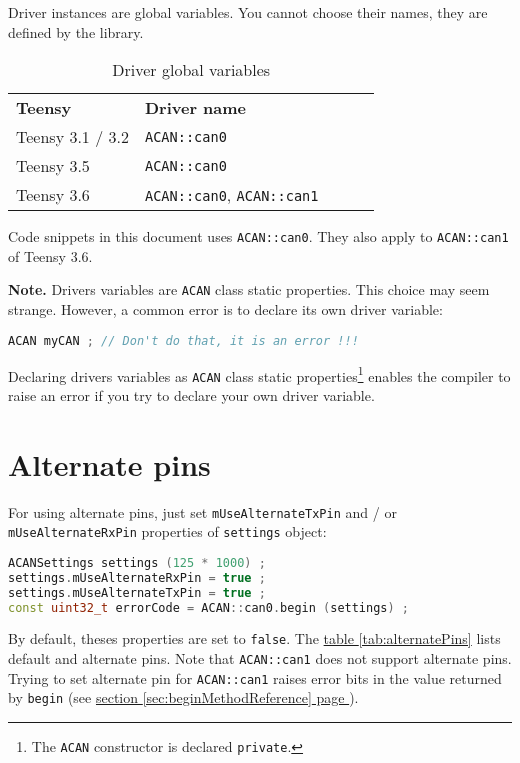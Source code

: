 \documentclass[10pt, a4paper, obeyspaces, openany]{extarticle}
\newcommand \sectionLabel[2]{\section{#1}\label{sec:#2}}
\newcommand\refSectionPage[1]{\hyperref[sec:#1]{section \ref*{sec:#1} page \pageref{sec:#1}}}
\newcommand\labelTableau[1]{\label{tab:#1}}
\newcommand\refTableau[1]{\hyperref[tab:#1]{table \ref*{tab:#1}}}
\begin{document}
Driver instances are global variables. You cannot choose their names, they are defined by the library.

\begin{table}[!ht]
  \small
  \onehalfspacing
  \centering
  \begin{tabular}{lllll}
    \textbf{Teensy}& \textbf{Driver name} \\
    Teensy 3.1 / 3.2 & \texttt{ACAN::can0}\\
    Teensy 3.5 &  \texttt{ACAN::can0}\\
    Teensy 3.6 &  \texttt{ACAN::can0}, \texttt{ACAN::can1}\\
   \end{tabular}
  \caption{Driver global variables}
  \labelTableau{varGlobalePiloteFlexCAN}
\end{table}

Code snippets in this document uses \texttt{ACAN::can0}. They also apply to \texttt{ACAN::can1} of Teensy 3.6.

{\bf Note.} Drivers variables are \texttt{ACAN} class static properties. This choice may seem strange. However, a common error is to declare its own driver variable: 
{ \small\begin{lstlisting}[language=c++]
ACAN myCAN ; // Don't do that, it is an error !!!
\end{lstlisting}}

Declaring drivers variables as \texttt{ACAN} class static properties\footnote{The \texttt{ACAN} constructor is declared \texttt{private}.} enables the compiler to raise an error if you try to declare your own driver variable.



\sectionLabel{Alternate pins}{alternatePins}

For using alternate pins, just set \texttt{mUseAlternateTxPin} and / or \texttt{mUseAlternateRxPin} properties of \texttt{settings} object:

{ \small\begin{lstlisting}[language=c++]
ACANSettings settings (125 * 1000) ;
settings.mUseAlternateRxPin = true ;
settings.mUseAlternateTxPin = true ;
const uint32_t errorCode = ACAN::can0.begin (settings) ;
\end{lstlisting}}

By default, theses properties are set to \texttt{false}. The \refTableau{alternatePins} lists default and alternate pins. Note that \texttt{ACAN::can1} does not support alternate pins. Trying to set alternate pin for \texttt{ACAN::can1} raises error bits in the value returned by \texttt{begin} (see \refSectionPage{beginMethodReference}). 
\end{document}
